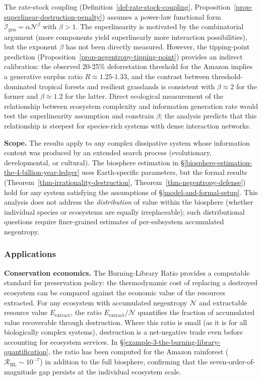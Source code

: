\documentclass[11pt]{article}
\theoremstyle{plain}
\theoremstyle{definition}
\theoremstyle{remark}
\let\origsubsubsection\subsubsection
\renewcommand{\subsubsection}{\needspace{4\baselineskip}\origsubsubsection}
\begin{document}
The rate-stock coupling (Definition~\ref{def-rate-stock-coupling},
Proposition~\ref{prop-superlinear-destruction-penalty}) assumes a
power-law functional form
\(\dot{\mathcal{I}}_{\text{gen}} = \alpha \mathcal{N}^\beta\) with
\(\beta > 1\). The superlinearity is motivated by the combinatorial
argument (more components yield superlinearly more interaction
possibilities), but the exponent \(\beta\) has not been directly
measured. However, the tipping-point prediction
(Proposition~\ref{prop-negentropy-tipping-point}) provides an indirect
calibration: the observed 20-25\% deforestation threshold for the Amazon
\citep{LovejoyNobre2018} implies a generative surplus ratio
\(R \approx 1.25\)-\(1.33\), and the contrast between
threshold-dominated tropical forests and resilient grasslands is
consistent with \(\beta \approx 2\) for the former and
\(\beta \approx 1.2\) for the latter. Direct ecological measurement of
the relationship between ecosystem complexity and information generation
rate would test the superlinearity assumption and constrain \(\beta\);
the analysis predicts that this relationship is steepest for
species-rich systems with dense interaction networks.

\textbf{Scope.} The results apply to any complex dissipative system
whose information content was produced by an extended search process
(evolutionary, developmental, or cultural). The biosphere estimation in
§\ref{biosphere-estimation-the-4-billion-year-ledger} uses
Earth-specific parameters, but the formal results
(Theorem~\ref{thm-irrationality-destruction},
Theorem~\ref{thm-negentropy-defense}) hold for any system satisfying the
assumptions of §\ref{model-and-formal-setup}. This analysis does not
address the \emph{distribution} of value within the biosphere (whether
individual species or ecosystems are equally irreplaceable); such
distributional questions require finer-grained estimates of
per-subsystem accumulated negentropy.

\subsubsection{Applications}\label{applications-2}

\textbf{Conservation economics.} The Burning-Library Ratio provides a
computable standard for preservation policy: the thermodynamic cost of
replacing a destroyed ecosystem can be compared against the economic
value of the resources extracted. For any ecosystem with accumulated
negentropy \(\mathcal{N}\) and extractable resource value
\(E_{\text{extract}}\), the ratio \(E_{\text{extract}} / \mathcal{N}\)
quantifies the fraction of accumulated value recoverable through
destruction. Where this ratio is small (as it is for all biologically
complex systems), destruction is a net-negative trade even before
accounting for ecosystem services. In
§\ref{example-3-the-burning-library-quantification}, the ratio has been
computed for the Amazon rainforest
(\(\mathcal{R}_{\text{BL}} \sim 10^{-7}\)) in addition to the full
biosphere, confirming that the seven-order-of-magnitude gap persists at
the individual ecosystem scale.
\end{document}
